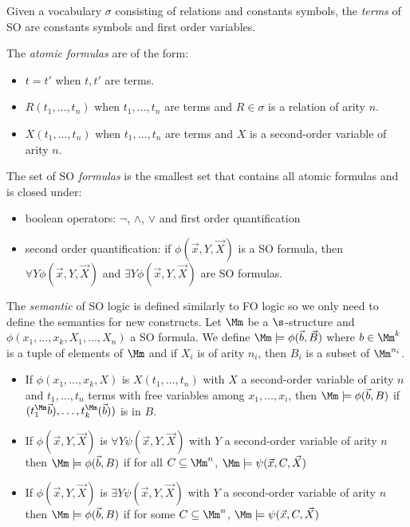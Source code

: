 \begin{definition}
    Given a vocabulary $\sigma$ consisting of relations
    and constants symbols,
    the \emph{terms} of SO are constants symbols and first order variables.

    The \emph{atomic formulas} are of the form:
    \begin{itemize}
        \item $t = t'$ when $t, t'$ are terms.
        \item $R(t_1, \dots, t_n)$ when $t_1, \dots, t_n$ are terms
            and $R \in \sigma$ is a relation of arity $n$.
        \item $X(t_1, \dots, t_n)$ when $t_1, \dots, t_n$ are terms
            and $X$ is a second-order variable of arity $n$.
    \end{itemize}

    The set of SO \emph{formulas} is the smallest set that contains
    all atomic formulas and is closed under:
    \begin{itemize}
        \item boolean operators: $\neg$, $\wedge$, $\vee$ and first order quantification
        \item second order quantification: if $\phi(\vec{x}, Y, \vec{X})$
            is a SO formula, then $\forall Y \phi(\vec{x}, Y, \vec{X})$
            and $\exists Y \phi(\vec{x}, Y, \vec{X})$ are SO formulas.
    \end{itemize}

    The \emph{semantic} of SO logic is defined similarly to FO logic
    so we only need to define the semantics for new constructs.
    Let $\Mm$ be a $\s$-structure and $\phi(x_1, \dots, x_k, X_1, \dots, X_n)$
    a SO formula. We define $\Mm \models \phi(\vec{b}, \vec{B})$
    where $b \in \Mm^k$ is a tuple of elements of $\Mm$
    and if $X_i$ is of arity $n_i$, then $B_i$ is a subset of $\Mm^{n_i}$.

    \begin{itemize}
        \item If $\phi(x_1, \dots, x_k, X)$ is $X(t_1, \dots, t_n)$
            with $X$ a second-order variable of arity $n$
            and $t_1, \dots, t_n$ terms with free variables
            among $x_1, \dots, x_i$, then
            $\Mm \models \phi(\vec{b}, B)$
            if $(t_1^\Mm\vec{b}), \dots, t_k^\Mm(\vec{b}))$ is in $B$.
        \item If $\phi(\vec{x}, Y, \vec{X})$ is $\forall Y \psi(\vec{x}, Y, \vec{X})$
            with $Y$ a second-order variable of arity $n$
            then $\Mm \models \phi(\vec{b}, B)$
            if for all $C \subseteq \Mm^n$, $\Mm \models \psi(\vec{x}, C, \vec{X})$
        \item If $\phi(\vec{x}, Y, \vec{X})$ is $\exists Y \psi(\vec{x}, Y, \vec{X})$
            with $Y$ a second-order variable of arity $n$
            then $\Mm \models \phi(\vec{b}, B)$
            if for some $C \subseteq \Mm^n$, $\Mm \models \psi(\vec{x}, C, \vec{X})$
    \end{itemize}
\end{definition}

